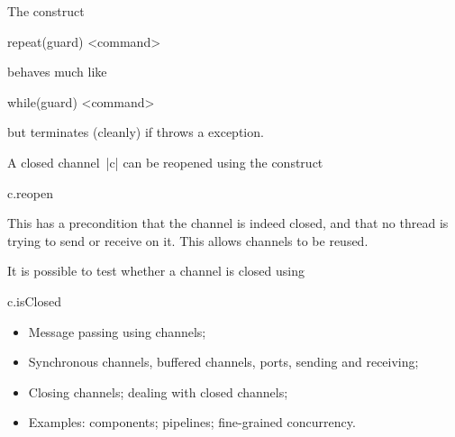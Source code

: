 \documentclass[notes,color]{sepslide0}
\begin{document}
\begin{slide}

The construct
%
\begin{scala}
  repeat(guard){ <command> }
\end{scala}
%
behaves much like
\begin{scala}
  while(guard){ <command> }
\end{scala}
but terminates (cleanly) if  throws a 
exception.

A closed channel~|c| can be reopened using the construct
\begin{scala}
  c.reopen
\end{scala}
%
This has a precondition that the channel is indeed closed, and that no thread
is trying to send or receive on it.  This allows channels to be reused.

It is possible to test whether a channel is closed using
%
\begin{scala}
  c.isClosed
\end{scala}
\end{slide}



\begin{slide}

\begin{itemize}
\item 
Message passing using channels;

\item
Synchronous channels, buffered channels, ports, sending and receiving;

\item
Closing channels; dealing with closed channels;

\item
Examples: components; pipelines; fine-grained concurrency.
\end{itemize}
\end{slide}
\end{document}
